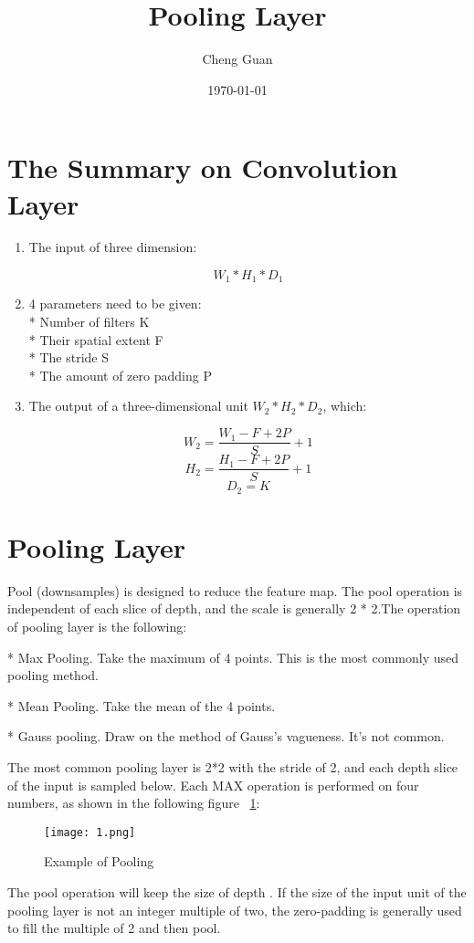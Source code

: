 \documentclass[a4paper,twocolumn]{article}
\title{Pooling Layer}
\author{Cheng Guan}
\date{\today}
\begin{document}
\maketitle

\section{The Summary on Convolution Layer}
\begin{enumerate}[1]\setlength{\itemsep}{0pt}
 \item The input of three dimension:
   \begin{center}
      \begin{equation}
      W_1 * H_1 * D_1
      \end{equation}
  \end{center}
 \item 4 parameters need to be given:\\
     * Number of filters K\\
     * Their spatial extent F\\
     * The stride S\\
     * The amount of zero padding P
 \item The output of a three-dimensional unit $W_2 * H_2 * D_2$, which:
  \begin{center}
      \begin{equation}
      W_2=\frac{W_1-F+2P}{S}+1
      \end{equation}
      \begin{equation}
      H_2=\frac{H_1-F+2P}{S}+1
      \end{equation}
      \begin{equation}
      D_2=K
      \end{equation}
  \end{center}
  \end{enumerate}
  \section{Pooling Layer}
  Pool (downsamples) is designed to reduce the feature map.
   The pool operation is independent of each slice of depth,
   and the scale is generally 2 * 2.The operation of pooling layer is the following\cite{test2}:

    * Max Pooling. Take the maximum of 4 points. This is the most commonly used pooling method.

    * Mean Pooling. Take the mean of the 4 points.

    * Gauss pooling. Draw on the method of Gauss's vagueness. It's not common.

  The most common pooling layer is 2*2 with the stride of 2, and each depth slice of the input is sampled below.
  Each MAX operation is performed on four numbers, as shown in the following figure ~\ref{fig1}:
  \begin{figure}[htbp]
  \centering
  \texttt{[image: 1.png]}
  \caption{Example of Pooling}
  \label{fig1}
  \end{figure}
  The pool operation will keep the size of depth .
  If the size of the input unit of the pooling layer is not an integer multiple of two,
  the zero-padding is generally used to fill the multiple of 2 and then pool.
  
  
\end{document}
